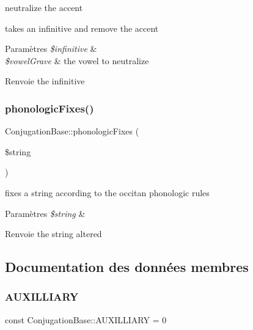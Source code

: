neutralize the accent 

takes an infinitive and remove the accent


\begin{DoxyParams}{Paramètres}
{\em \$infinitive} & \\
\hline
{\em \$vowel\+Grave} & the vowel to neutralize \\
\hline
\end{DoxyParams}
\begin{DoxyReturn}{Renvoie}
the infinitive 
\end{DoxyReturn}
\hypertarget{classConjugationBase_a4e623e786e39aecdaf26913685f9f040}{}\label{classConjugationBase_a4e623e786e39aecdaf26913685f9f040} 
\subsubsection{\texorpdfstring{phonologic\+Fixes()}{phonologicFixes()}}
{\footnotesize\ttfamily Conjugation\+Base\+::phonologic\+Fixes (\begin{DoxyParamCaption}\item[{}]{\$string }\end{DoxyParamCaption})\hspace{0.3cm}{\ttfamily [protected]}}



fixes a string according to the occitan phonologic rules 


\begin{DoxyParams}{Paramètres}
{\em \$string} & \\
\hline
\end{DoxyParams}
\begin{DoxyReturn}{Renvoie}
the string altered 
\end{DoxyReturn}


\subsection{Documentation des données membres}
\hypertarget{classConjugationBase_a997e57538ff7276bae361d1333f11d11}{}\label{classConjugationBase_a997e57538ff7276bae361d1333f11d11} 
\subsubsection{\texorpdfstring{A\+U\+X\+I\+L\+L\+I\+A\+RY}{AUXILLIARY}}
{\footnotesize\ttfamily const Conjugation\+Base\+::\+A\+U\+X\+I\+L\+L\+I\+A\+RY = 0}

